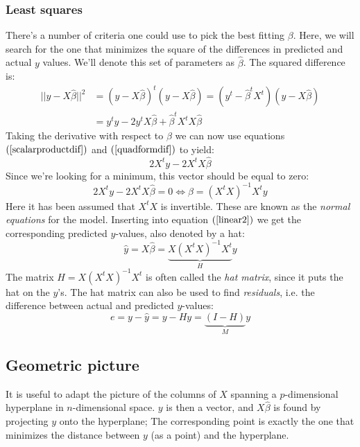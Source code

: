 \documentclass[12pt, a4paper]{article}
\begin{document}
\subsubsection{Least squares}
There's a number of criteria one could use to pick the best fitting $\beta$. Here, we will search for the one that minimizes the square of the differences in predicted and actual $y$ values. We'll denote this set of parameters as $\hat{\beta}$. The squared difference is:
\begin{align*}
||y-X\hat{\beta}||^2 &=(y-X\hat{\beta})^t(y-X\hat{\beta})=(y^t-\hat{\beta}^t X^t)(y-X\hat{\beta})\\
&=y^t y - 2y^t X\hat{\beta} + \hat{\beta}^t X^t X\hat{\beta}
\end{align*}
Taking the derivative with respect to $\beta$ we can now use equations $(\ref{scalarproductdif})$ and $(\ref{quadformdif})$ to yield:
\begin{equation}
2X^t y - 2X^t X\hat{\beta}
\end{equation}
Since we're looking for a minimum, this vector should be equal to zero:
\begin{equation}
\label{normaleq}
2X^t y - 2X^t X\hat{\beta}=0\Leftrightarrow\hat{\beta}=(X^t X)^{-1}X^t y
\end{equation}
Here it has been assumed that $X^t X$ is invertible. These are known as the \textit{normal equations} for the model. Inserting into equation $(\ref{linear2})$ we get the corresponding predicted $y$-values, also denoted by a hat:
\begin{equation}
\hat{y}=X\hat{\beta}=\underbrace{X(X^t X)^{-1}X^t}_{H}y
\end{equation}
The matrix $H=X(X^t X)^{-1}X^t$ is often called the \textit{hat matrix}, since it puts the hat on the $y$'s. The hat matrix can also be used to find \textit{residuals}, i.e. the difference between actual and predicted $y$-values:
\begin{equation}
e=y-\hat{y}=y-Hy=\underbrace{(I-H)}_{M} y
\end{equation}

\subsection{Geometric picture}
It is useful to adapt the picture of the columns of $X$ spanning a $p$-dimensional hyperplane in $n$-dimensional space. $y$ is then a vector, and $X\hat{\beta}$ is found by projecting $y$ onto the hyperplane; The corresponding point is exactly the one that minimizes the distance between $y$ (as a point) and the hyperplane.
\end{document}

